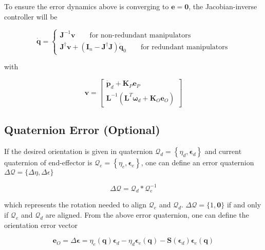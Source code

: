 \documentclass[10pt]{article}
\begin{document}
To ensure the error dynamics above is converging to $\boldsymbol{e}=\boldsymbol{0}$,  the Jacobian-inverse controller will be





$$
\dot{\boldsymbol{q}}=
\begin{cases}
\boldsymbol{J}^{-1} \boldsymbol{v}  \quad\quad\text{for non-redundant manipulators} \\
\boldsymbol{J}^{\dagger}\boldsymbol{v}+\left(\boldsymbol{I}_{n}-\boldsymbol{J}^{\dagger} \boldsymbol{J}\right) \dot{\boldsymbol{q}}_{0} \quad\quad\text{for redundant manipulators}
\end{cases}
$$

with 

$$
\boldsymbol{v}=\left[\begin{array}{c}
\dot{\boldsymbol{p}}_{d}+\boldsymbol{K}_{P} \boldsymbol{e}_{P} \\
\boldsymbol{L}^{-1}\left(\boldsymbol{L}^{T} \boldsymbol{\omega}_{d}+\boldsymbol{K}_{O} \boldsymbol{e}_{O}\right)
\end{array}\right]
$$







\subsection{Quaternion Error (Optional)}
If the desired orientation is given in quaternion $\mathcal{Q}_{d}=\left\{\eta_{d}, \boldsymbol{\epsilon}_{d}\right\}$ and current quaternion of end-effector is $\mathcal{Q}_{e}=\left\{\eta_{e}, \boldsymbol{\epsilon}_{e}\right\}$, one can define an error  quaternion $\Delta \mathcal{Q}=\{\Delta \eta, \Delta \epsilon\}$ 

$$
\Delta \mathcal{Q}=\mathcal{Q}_{d} * \mathcal{Q}_{e}^{-1}
$$

which represents the rotation needed to align $\mathcal{Q}_{e}$ and $\mathcal{Q}_{d}$. $\Delta \mathcal{Q}=\{1, \mathbf{0}\}$ if and only if $\mathcal{Q}_{e}$ and $\mathcal{Q}_{d}$ are aligned.
From the above error quaternion, one can define the orientation error vector




$$
\boldsymbol{e}_{O}=\Delta \boldsymbol{\epsilon}=\eta_{e}(\boldsymbol{q}) \boldsymbol{\epsilon}_{d}-\eta_{d} \boldsymbol{\epsilon}_{e}(\boldsymbol{q})-\boldsymbol{S}\left(\boldsymbol{\epsilon}_{d}\right) \boldsymbol{\epsilon}_{e}(\boldsymbol{q})
$$
\end{document}
